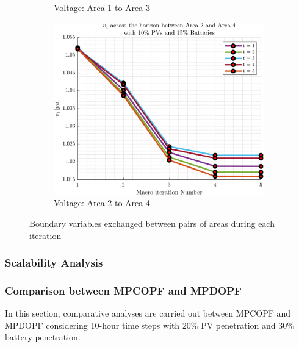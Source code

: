 \documentclass[../../outputs/main.tex]{subfiles}
\begin{document}
\begin{figure}[h!]
\begin{subfigure}[b]{0.3\textwidth}
        \caption{Voltage: Area 1 to Area 3}
        \label{fig:voltage_1_3}
    \end{subfigure}
    \hfill
    \begin{subfigure}[b]{0.3\textwidth}
        \centering
        \includegraphics[width=\textwidth]{../figures/T5-pv10-batt15-vBoundary/BoundaryVoltage_vs_t_vs_macroItr_5Areas_2_4_genCost_pv_10_batt_15_.png}
        \caption{Voltage: Area 2 to Area 4}
        \label{fig:voltage_2_4}
    \end{subfigure}

    \caption{Boundary variables exchanged between pairs of areas during each iteration}
    \label{fig:boundary_variables_all}
\end{figure}





\subsubsection{Scalability Analysis}

\subsubsection{Comparison between MPCOPF and MPDOPF}
In this section, comparative analyses are carried out between MPCOPF and MPDOPF considering 10-hour time steps with $20\%$ PV penetration and $30\%$ battery penetration.
\end{document}
